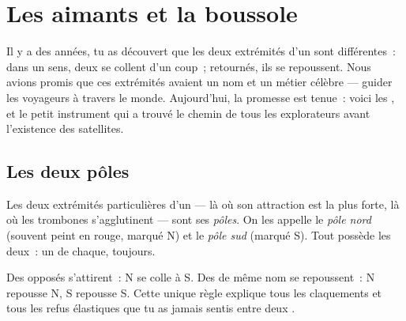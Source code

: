 \chapter{Les aimants et la boussole}\label{ch:g4:magnets-and-compass}

Il y a des années, tu as découvert que les deux extrémités d'un
 sont différentes~: dans un sens, deux  se collent d'un
coup~; retournés, ils se repoussent. Nous avions promis que ces
extrémités avaient un nom et un métier célèbre --- guider les
voyageurs à travers le monde. Aujourd'hui, la promesse est tenue~:
voici les , et le petit instrument qui a trouvé le chemin de
tous les explorateurs avant l'existence des satellites.

\section{Les deux pôles}

\begin{definition}[Pôles]\label{def:g4:magnets-and-compass:poles}
Les deux extrémités particulières d'un  --- là où son
attraction est la plus forte, là où les trombones s'agglutinent ---
sont ses \emph{pôles}. On les appelle le \emph{pôle
nord} (souvent peint en rouge, marqué N) et le
\emph{pôle sud} (marqué S). Tout  possède les
deux~: un de chaque, toujours.
\end{definition}

\begin{proposition}\label{prop:g4:magnets-and-compass:rule}
Des  opposés s'attirent~: N se colle à S. Des  de même nom
se repoussent~: N repousse N, S repousse S. Cette unique règle
explique tous les claquements et tous les refus élastiques que tu as
jamais sentis entre deux .
\end{proposition}


